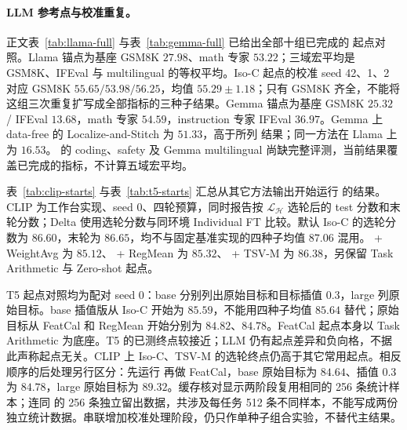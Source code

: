 \paragraph{LLM 参考点与校准重复。}
正文表~\ref{tab:llama-full} 与表~\ref{tab:gemma-full} 已给出全部十组已完成的 \method{} 起点对照。Llama 锚点为基座 GSM8K $27.98$、math 专家 $53.22$；三域宏平均是 GSM8K、IFEval 与 multilingual 的等权平均。Iso-C 起点的校准 seed 42、1、2 对应 GSM8K $55.65/53.98/56.25$，均值 $55.29\pm 1.18$；只有 GSM8K 齐全，不能将这组三次重复扩写成全部指标的三种子结果。Gemma 锚点为基座 GSM8K $25.32$ / IFEval $13.68$，math 专家 $54.59$，instruction 专家 IFEval $36.97$。Gemma 上 data-free 的 Localize-and-Stitch 为 $51.33$，高于所列 \method{} 结果；同一方法在 Llama 上为 $16.53$。\method{} 的 coding、safety 及 Gemma multilingual 尚缺完整评测，当前结果覆盖已完成的指标，不计算五域宏平均。

表~\ref{tab:clip-starts} 与表~\ref{tab:t5-starts} 汇总从其它方法输出开始运行 \method{} 的结果。CLIP 为工作台实现、seed 0、四轮预算，同时报告按 $\mathcal L_{\mathcal H}$ 选轮后的 test 分数和末轮分数；Delta 使用选轮分数与同环境 Individual FT 比较。默认 Iso-C 的选轮分数为 $86.60$，末轮为 $86.65$，均不与固定基准实现的四种子均值 $87.06$ 混用。\method{} + WeightAvg 为 $85.12$、\method{} + RegMean 为 $85.32$、\method{} + TSV-M 为 $86.38$，另保留 Task Arithmetic 与 Zero-shot 起点。

T5 起点对照均为配对 seed 0：base 分别列出原始目标和目标插值 $0.3$，large 列原始目标。base 插值版从 Iso-C 开始为 $85.59$，不能用四种子均值 $85.64$ 替代；原始目标从 FeatCal 和 RegMean 开始分别为 $84.82$、$84.78$。FeatCal 起点本身以 Task Arithmetic 为底座。T5 的已测终点较接近；LLM 仍有起点差异和负向格，不据此声称起点无关。CLIP 上 Iso-C、TSV-M 的选轮终点仍高于其它常用起点。相反顺序的后处理另行区分：先运行 \method{} 再做 FeatCal，base 原始目标为 $84.64$、插值 $0.3$ 为 $84.78$，large 原始目标为 $89.32$。缓存核对显示两阶段复用相同的 256 条统计样本；连同 \method{} 的 256 条独立留出数据，共涉及每任务 512 条不同样本，不能写成两份独立统计数据。串联增加校准处理阶段，仍只作单种子组合实验，不替代主结果。

\begin{table}[htbp]
\centering\small
\caption{CLIP ViT-B/32 八任务换起点（工作台，同一 seed 0、四轮预算）。留出选轮与末轮均为 test 分数；Delta 相对 Individual FT 为百分点差。}
\label{tab:clip-starts}

\end{table}

\begin{table}[htbp]
\centering\small
\caption{Flan-T5 换起点（同一 seed 0）。原始目标与目标插值分列；FeatCal 起点以 Task Arithmetic 为底座。横线表示缺测。}
\label{tab:t5-starts}
\resizebox{\textwidth}{!}{}
\end{table}

